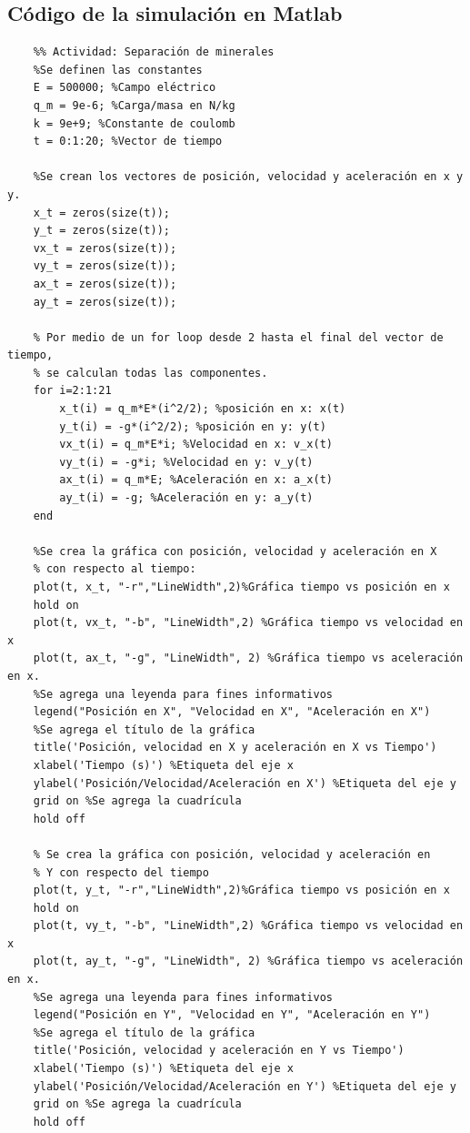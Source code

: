 \documentclass[12pt, letterpaper]{report}
\begin{document}
\subsection*{Código de la simulación en Matlab}
\begin{verbatim}
    %% Actividad: Separación de minerales 
    %Se definen las constantes 
    E = 500000; %Campo eléctrico
    q_m = 9e-6; %Carga/masa en N/kg
    k = 9e+9; %Constante de coulomb
    t = 0:1:20; %Vector de tiempo
    
    %Se crean los vectores de posición, velocidad y aceleración en x y y. 
    x_t = zeros(size(t)); 
    y_t = zeros(size(t)); 
    vx_t = zeros(size(t)); 
    vy_t = zeros(size(t)); 
    ax_t = zeros(size(t)); 
    ay_t = zeros(size(t)); 
    
    % Por medio de un for loop desde 2 hasta el final del vector de tiempo, 
    % se calculan todas las componentes. 
    for i=2:1:21 
        x_t(i) = q_m*E*(i^2/2); %posición en x: x(t)
        y_t(i) = -g*(i^2/2); %posición en y: y(t)
        vx_t(i) = q_m*E*i; %Velocidad en x: v_x(t)
        vy_t(i) = -g*i; %Velocidad en y: v_y(t)
        ax_t(i) = q_m*E; %Aceleración en x: a_x(t)
        ay_t(i) = -g; %Aceleración en y: a_y(t)
    end
    
    %Se crea la gráfica con posición, velocidad y aceleración en X 
    % con respecto al tiempo: 
    plot(t, x_t, "-r","LineWidth",2)%Gráfica tiempo vs posición en x
    hold on
    plot(t, vx_t, "-b", "LineWidth",2) %Gráfica tiempo vs velocidad en x
    plot(t, ax_t, "-g", "LineWidth", 2) %Gráfica tiempo vs aceleración en x.
    %Se agrega una leyenda para fines informativos 
    legend("Posición en X", "Velocidad en X", "Aceleración en X")
    %Se agrega el título de la gráfica
    title('Posición, velocidad en X y aceleración en X vs Tiempo') 
    xlabel('Tiempo (s)') %Etiqueta del eje x
    ylabel('Posición/Velocidad/Aceleración en X') %Etiqueta del eje y
    grid on %Se agrega la cuadrícula 
    hold off 
        
    % Se crea la gráfica con posición, velocidad y aceleración en
    % Y con respecto del tiempo
    plot(t, y_t, "-r","LineWidth",2)%Gráfica tiempo vs posición en x
    hold on
    plot(t, vy_t, "-b", "LineWidth",2) %Gráfica tiempo vs velocidad en x
    plot(t, ay_t, "-g", "LineWidth", 2) %Gráfica tiempo vs aceleración en x.
    %Se agrega una leyenda para fines informativos 
    legend("Posición en Y", "Velocidad en Y", "Aceleración en Y") 
    %Se agrega el título de la gráfica
    title('Posición, velocidad y aceleración en Y vs Tiempo') 
    xlabel('Tiempo (s)') %Etiqueta del eje x
    ylabel('Posición/Velocidad/Aceleración en Y') %Etiqueta del eje y
    grid on %Se agrega la cuadrícula 
    hold off 
\end{verbatim}
\end{document}
